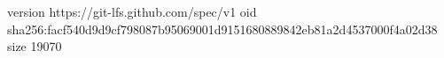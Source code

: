 version https://git-lfs.github.com/spec/v1
oid sha256:facf540d9d9cf798087b95069001d9151680889842eb81a2d4537000f4a02d38
size 19070
